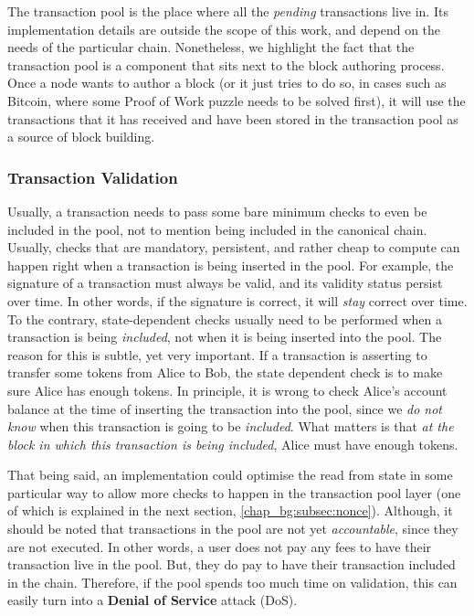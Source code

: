 The transaction pool is the place where all the \textit{pending} transactions live in. Its
implementation details are outside the scope of this work, and depend on the needs of the particular
chain. Nonetheless, we highlight the fact that the transaction pool is a component that sits next to
the block authoring process. Once a node wants to author a block (or it just tries to do so, in cases
such as Bitcoin, where some Proof of Work puzzle needs to be solved first), it will use the
transactions that it has received and have been stored in the transaction pool as a source of block
building.

\subsubsection{Transaction Validation} \label{chap_bg:subsec:validation}

Usually, a transaction needs to pass some bare minimum checks to even be included in the pool, not to
mention being included in the canonical chain. Usually, checks that are mandatory, persistent, and
rather cheap to compute can happen right when a transaction is being inserted in the pool. For
example, the signature of a transaction must always be valid, and its validity status persist over
time. In other words, if the signature is correct, it will \textit{stay} correct over time. To the
contrary, state-dependent checks usually need to be performed when a transaction is being
\textit{included}, not when it is being inserted into the pool. The reason for this is subtle, yet
very important. If a transaction is asserting to transfer some tokens from Alice to Bob, the state
dependent check is to make sure Alice has enough tokens. In principle, it is wrong to check Alice's
account balance at the time of inserting the transaction into the pool, since we \textit{do not
know} when this transaction is going to be \textit{included}. What matters is that \textit{at the
block in which this transaction is being included}, Alice must have enough tokens.

That being said, an implementation could optimise the read from state in some particular way to
allow more checks to happen in the transaction pool layer (one of which is explained in the next
section, \ref{chap_bg:subsec:nonce}). Although, it should be noted that transactions in the pool are
not yet \textit{accountable}, since they are not executed. In other words, a user does not pay any
fees to have their transaction live in the pool. But, they do pay to have their transaction included
in the chain. Therefore, if the pool spends too much time on validation, this can easily turn into a
\textbf{Denial of Service} attack (DoS).

